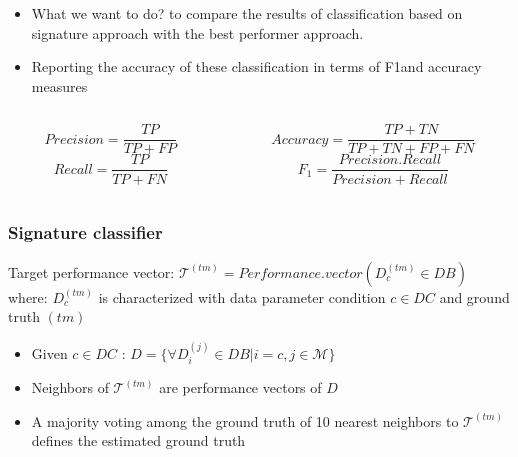 \documentclass{beamer}
\begin{document}
\begin{frame}
\begin{overprint}
\begin{itemize}
	\item What we want to do? to compare the results of classification based on signature approach with the best performer \small approach.
	\item Reporting the accuracy of these classification in terms of F1and accuracy measures
\end{itemize}
\begin{columns}
\begin{column}{.4\textwidth}
\vspace{-0.5cm}
\begin{center}

\[Precision = \frac{TP}{TP+FP}\]
\[Recall = \frac{TP}{TP+FN}\]

\end{center}
\end{column}
\begin{column}{.6\textwidth}
\vspace{-1cm}
\begin{center}
\[Accuracy = \frac{TP+TN}{TP+TN+FP+FN}\]
\[F_1 = \frac{Precision.Recall}{Precision+Recall}\]
\end{center}
\end{column}
\end{columns}
\end{overprint}


\end{frame}

\begin{frame}\frametitle{Signature classifier}
\small{Target performance vector:} $\mathcal{T}^{(tm)} = Performance.vector(D_c^{(tm)} \in DB)$ where: $D_c^{(tm)}$ is characterized with data parameter condition $c \in DC$ and ground truth $(tm)$  \pause
\begin{itemize}
\item Given $c \in DC$  : $D = \{\forall D_i^{(j)} \in DB | i = c , j \in \mathcal{M} \}$ \pause
\item Neighbors of $\mathcal{T}^{(tm)}$ are performance vectors of $D$ \pause
\item A majority voting among the ground truth of 10 nearest neighbors to $\mathcal{T}^{(tm)}$ defines the estimated ground truth 
\end{itemize}
\end{frame}
\end{document}
